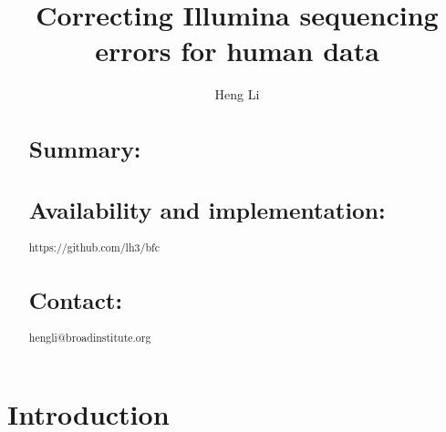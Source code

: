 \documentclass{bioinfo}
\begin{document}

\title[Error Correction for Illumina Data]{Correcting Illumina sequencing errors for human data}

\author[Li]{Heng Li}

\address{Broad Institute, 75 Ames Street, Cambridge, MA 02142, USA}

\maketitle

\begin{abstract}
\section{Summary:}

\section{Availability and implementation:} https://github.com/lh3/bfc

\section{Contact:} hengli@broadinstitute.org
\end{abstract}

\section{Introduction}
\end{document}
